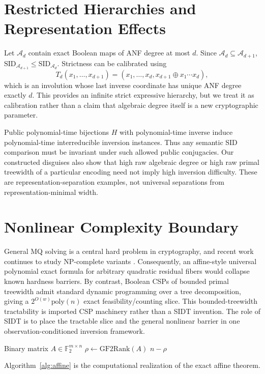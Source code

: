 \documentclass[11pt]{article}
\begin{document}
\section{Restricted Hierarchies and Representation Effects}
Let $\mathcal A_d$ contain exact Boolean maps of ANF degree at most $d$. Since $\mathcal A_d\subseteq\mathcal A_{d+1}$, $\mathrm{SID}_{\mathcal A_{d+1}}\le\mathrm{SID}_{\mathcal A_d}$. Strictness can be calibrated using
\[
T_d(x_1,\ldots,x_{d+1})=(x_1,\ldots,x_d,x_{d+1}\oplus x_1\cdots x_d),
\]
which is an involution whose last inverse coordinate has unique ANF degree exactly $d$. This provides an infinite strict expressive hierarchy, but we treat it as calibration rather than a claim that algebraic degree itself is a new cryptographic parameter.

Public polynomial-time bijections $H$ with polynomial-time inverse induce polynomial-time interreducible inversion instances. Thus any semantic SID comparison must be invariant under such allowed public conjugacies. Our constructed disguises also show that high raw algebraic degree or high raw primal treewidth of a particular encoding need not imply high inversion difficulty. These are representation-separation examples, not universal separations from representation-minimal width.

\section{Nonlinear Complexity Boundary}
General MQ solving is a central hard problem in cryptography, and recent work continues to study NP-complete variants \parencite{mqregular2025}. Consequently, an affine-style universal polynomial exact formula for arbitrary quadratic residual fibers would collapse known hardness barriers. By contrast, Boolean CSPs of bounded primal treewidth admit standard dynamic programming over a tree decomposition, giving a $2^{O(w)}\mathrm{poly}(n)$ exact feasibility/counting slice. This bounded-treewidth tractability is imported CSP machinery rather than a SIDT invention. The role of SIDT is to place the tractable slice and the general nonlinear barrier in one observation-conditioned inversion framework.

\begin{algorithm}
\caption{Exact affine SID}\label{alg:affine}
\begin{algorithmic}[1]
\Require Binary matrix $A\in\mathbb F_2^{m\times n}$
\State $\rho\gets\mathrm{GF2Rank}(A)$
\State \Return $n-\rho$
\end{algorithmic}
\end{algorithm}
Algorithm~\ref{alg:affine} is the computational realization of the exact affine theorem.
\end{document}
